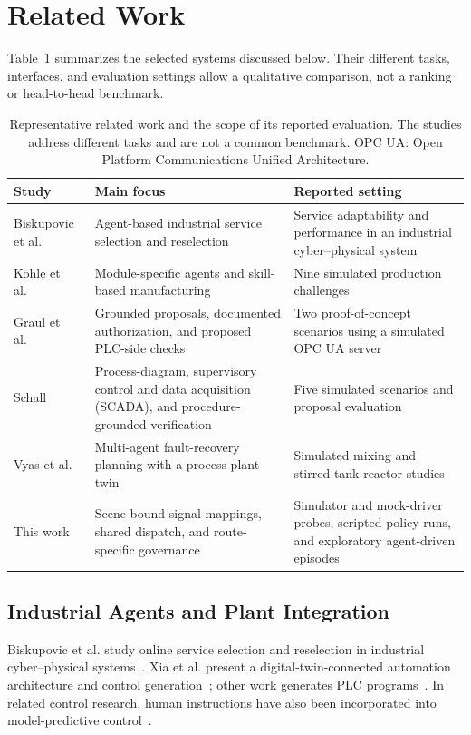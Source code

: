 \section{Related Work}
\label{sec:related}
Table~\ref{tab:related-comparison} summarizes the selected systems discussed below. Their different tasks, interfaces, and evaluation settings allow a qualitative comparison, not a ranking or head-to-head benchmark.

\begin{table}[!t]
\centering
\caption{Representative related work and the scope of its reported evaluation. The studies address different tasks and are not a common benchmark. OPC UA: Open Platform Communications Unified Architecture.}
\label{tab:related-comparison}
\footnotesize
\setlength{\tabcolsep}{5pt}
\begin{tabularx}{\textwidth}{@{}>{\raggedright\arraybackslash}p{}>{\raggedright\arraybackslash}p{}X@{}}
\toprule
Study & Main focus & Reported setting \\
\midrule
Biskupovic et al.~\cite{biskupovic2025supervision} & Agent-based industrial service selection and reselection & Service adaptability and performance in an industrial cyber--physical system \\
K\"{o}hle et al.~\cite{koehle2026llmdriven} & Module-specific agents and skill-based manufacturing & Nine simulated production challenges \\
Graul et al.~\cite{graul2026aas} & Grounded proposals, documented authorization, and proposed PLC-side checks & Two proof-of-concept scenarios using a simulated OPC UA server \\
Schall~\cite{schall2026safe} & Process-diagram, supervisory control and data acquisition (SCADA), and procedure-grounded verification & Five simulated scenarios and proposal evaluation \\
Vyas et al.~\cite{vyas2026detection} & Multi-agent fault-recovery planning with a process-plant twin & Simulated mixing and stirred-tank reactor studies \\
This work & Scene-bound signal mappings, shared dispatch, and route-specific governance & Simulator and mock-driver probes, scripted policy runs, and exploratory agent-driven episodes \\
\bottomrule
\end{tabularx}
\end{table}

\subsection{Industrial Agents and Plant Integration}
Biskupovic et al. study online service selection and reselection in industrial cyber--physical systems~\cite{biskupovic2025supervision}. Xia et al. present a digital-twin-connected automation architecture and control generation~\cite{xia2025architecture,xia2025control}; other work generates PLC programs~\cite{liu2026agents4plc}. In related control research, human instructions have also been incorporated into model-predictive control~\cite{wu2025instructmpc}.

